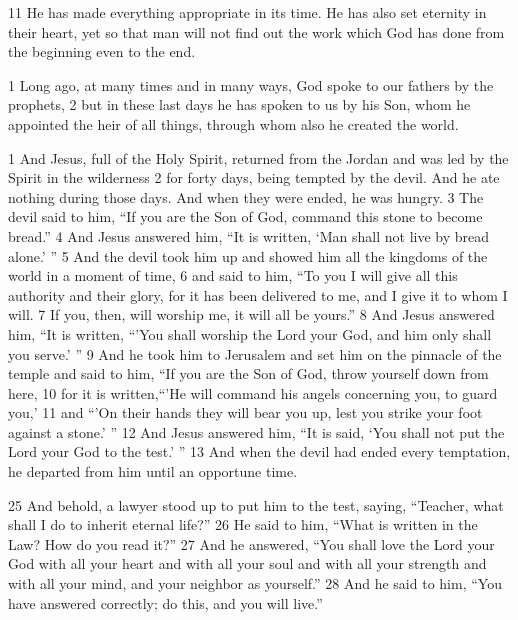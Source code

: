 \begin{bible}
11 He has made everything appropriate in its time. He has also set eternity in their heart, yet so that man will not find out the work which God has done from the beginning even to the end.

1 Long ago, at many times and in many ways, God spoke to our fathers by the prophets, 2 but in these last days he has spoken to us by his Son, whom he appointed the heir of all things, through whom also he created the world.

1 And Jesus, full of the Holy Spirit, returned from the Jordan and was led by the Spirit in the wilderness 2 for forty days, being tempted by the devil. And he ate nothing during those days. And when they were ended, he was hungry. 3 The devil said to him, ``If you are the Son of God, command this stone to become bread.'' 4 And Jesus answered him, ``It is written, `Man shall not live by bread alone.' '' 5 And the devil took him up and showed him all the kingdoms of the world in a moment of time, 6 and said to him, ``To you I will give all this authority and their glory, for it has been delivered to me, and I give it to whom I will. 7 If you, then, will worship me, it will all be yours.'' 8 And Jesus answered him, ``It is written, ``'You shall worship the Lord your God, and him only shall you serve.' '' 9 And he took him to Jerusalem and set him on the pinnacle of the temple and said to him, ``If you are the Son of God, throw yourself down from here, 10 for it is written,``'He will command his angels concerning you, to guard you,' 11 and ``'On their hands they will bear you up, lest you strike your foot against a stone.' '' 12 And Jesus answered him, ``It is said, `You shall not put the Lord your God to the test.' '' 13 And when the devil had ended every temptation, he departed from him until an opportune time. 

25 And behold, a lawyer stood up to put him to the test, saying, ``Teacher, what shall I do to inherit eternal life?'' 26 He said to him, ``What is written in the Law? How do you read it?'' 27 And he answered, ``You shall love the Lord your God with all your heart and with all your soul and with all your strength and with all your mind, and your neighbor as yourself.'' 28 And he said to him, ``You have answered correctly; do this, and you will live.'' 

\end{bible}

